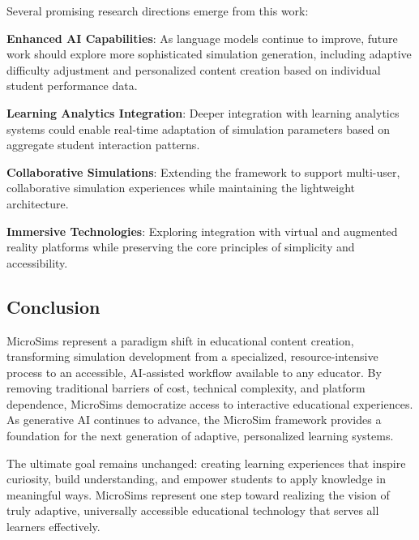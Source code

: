Several promising research directions emerge from this work:

\textbf{Enhanced AI Capabilities}: As language models continue to improve, future work should explore more sophisticated simulation generation, including adaptive difficulty adjustment and personalized content creation based on individual student performance data.

\textbf{Learning Analytics Integration}: Deeper integration with learning analytics systems could enable real-time adaptation of simulation parameters based on aggregate student interaction patterns.

\textbf{Collaborative Simulations}: Extending the framework to support multi-user, collaborative simulation experiences while maintaining the lightweight architecture.

\textbf{Immersive Technologies}: Exploring integration with virtual and augmented reality platforms while preserving the core principles of simplicity and accessibility.

\subsection{Conclusion}

MicroSims represent a paradigm shift in educational content creation, transforming simulation development from a specialized, resource-intensive process to an accessible, AI-assisted workflow available to any educator. By removing traditional barriers of cost, technical complexity, and platform dependence, MicroSims democratize access to interactive educational experiences. As generative AI continues to advance, the MicroSim framework provides a foundation for the next generation of adaptive, personalized learning systems.

The ultimate goal remains unchanged: creating learning experiences that inspire curiosity, build understanding, and empower students to apply knowledge in meaningful ways. MicroSims represent one step toward realizing the vision of truly adaptive, universally accessible educational technology that serves all learners effectively.
